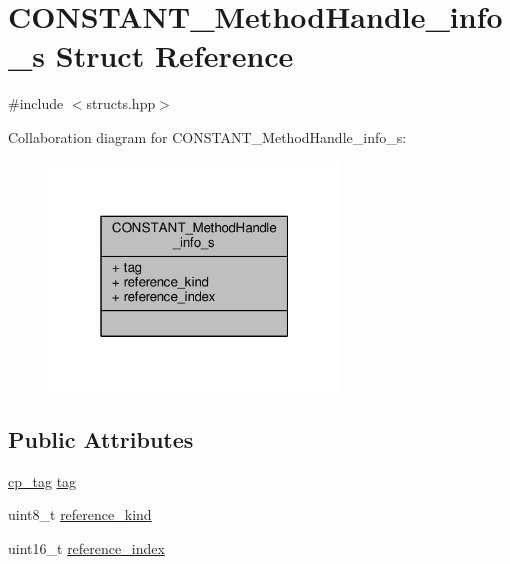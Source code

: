 \hypertarget{structCONSTANT__MethodHandle__info__s}{\section{C\+O\+N\+S\+T\+A\+N\+T\+\_\+\+Method\+Handle\+\_\+info\+\_\+s Struct Reference}
\label{structCONSTANT__MethodHandle__info__s}
}


{\ttfamily \#include $<$structs.\+hpp$>$}



Collaboration diagram for C\+O\+N\+S\+T\+A\+N\+T\+\_\+\+Method\+Handle\+\_\+info\+\_\+s\+:\nopagebreak
\begin{figure}[H]
\begin{center}
\leavevmode
\includegraphics[width=220pt]{structCONSTANT__MethodHandle__info__s__coll__graph}
\end{center}
\end{figure}
\subsection*{Public Attributes}
\begin{DoxyCompactItemize}
\item 
\hyperlink{structs_8hpp_a17947ec3f3c1f2392eabd36c1ba5fec6}{cp\+\_\+tag} \hyperlink{structCONSTANT__MethodHandle__info__s_ac82e027678357e8dda9d759ea771848d}{tag}
\item 
uint8\+\_\+t \hyperlink{structCONSTANT__MethodHandle__info__s_a013248dcf4a680295f921041c203a51b}{reference\+\_\+kind}
\item 
uint16\+\_\+t \hyperlink{structCONSTANT__MethodHandle__info__s_a99ccde8a51c1a29e8b90816e11d36a0d}{reference\+\_\+index}
\end{DoxyCompactItemize}



